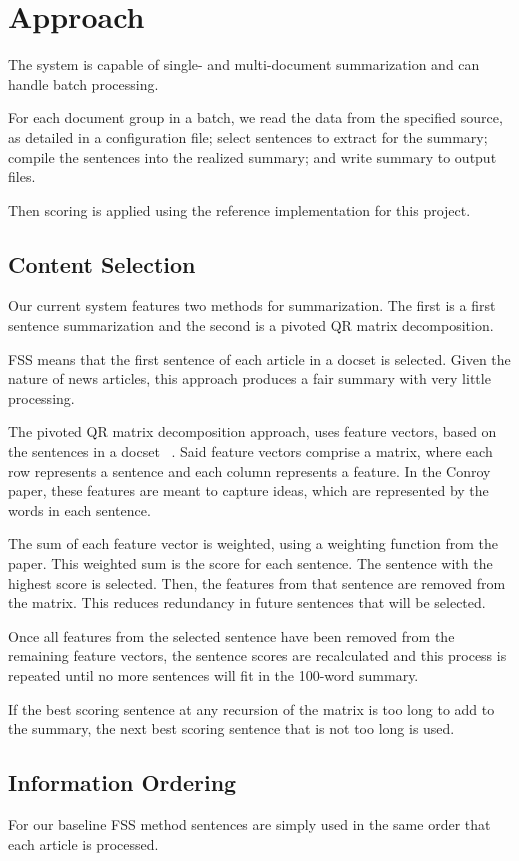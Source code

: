 \documentclass[11pt,a4paper]{article}
\begin{document}
\section{Approach}
The system is capable of single- and multi-document summarization and can handle batch processing. 

For each document group in a batch, we read the data from the specified source, as detailed in a configuration file; select sentences to extract for the summary; compile the sentences into the realized summary; and write summary to output files.

Then scoring is applied using the reference implementation for this project.

\subsection{Content Selection}
Our current system features two methods for summarization. The first is a first sentence summarization and the second is a pivoted QR matrix decomposition. 

FSS means that the first sentence of each article in a docset is selected. Given the nature of news articles, this approach produces a fair summary with very little processing.

The pivoted QR matrix decomposition approach, uses feature vectors, based on the sentences in a docset ~\cite{Conroy:01}. Said feature vectors comprise a matrix, where each row represents a sentence and each column represents a feature. In the Conroy paper, these features are meant to capture ideas, which are represented by the words in each sentence. 

The sum of each feature vector is weighted, using a weighting function from the paper. This weighted sum is the score for each sentence. The sentence with the highest score is selected. Then, the features from that sentence are removed from the matrix. This reduces redundancy in future sentences that will be selected. 

Once all features from the selected sentence have been removed from the remaining feature vectors, the sentence scores are recalculated and this process is repeated until no more sentences will fit in the 100-word summary.

If the best scoring sentence at any recursion of the matrix is too long to add to the summary, the next best scoring sentence that is not too long is used. 

\subsection{Information Ordering}
For our baseline FSS method sentences are simply used in the same order that each article is processed.
\end{document}
